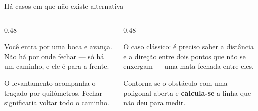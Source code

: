 \documentclass[aspectratio=169,11pt]{beamer}
\newcommand{\bnum}[1]{\textbf{\textcolor{mTeal}{#1}}}
\begin{document}
\begin{frame}{Há casos em que não existe alternativa}
  \begin{columns}[T]
    \begin{column}{0.48\textwidth}
      \begin{ideia}[title={Túnel e mina}]
        Você entra por uma boca e avança. Não há por onde fechar --- só há um caminho, e ele
        é para a frente.
      \end{ideia}
      \medskip
      \begin{ideia}[title={Faixa de estrada}]
        O levantamento acompanha o traçado por quilômetros. Fechar significaria voltar todo
        o caminho.
      \end{ideia}
    \end{column}
    \begin{column}{0.48\textwidth}
      \begin{ideia}[title={A linha que você não consegue medir}]
        O caso clássico: é preciso saber a distância e a direção entre dois pontos que
        \alert{não se enxergam} --- uma mata fechada entre eles.
        \medskip

        Contorna-se o obstáculo com uma poligonal aberta e \bnum{calcula-se} a linha que não
        deu para medir.
      \end{ideia}
    \end{column}
  \end{columns}
\end{frame}
\end{document}
